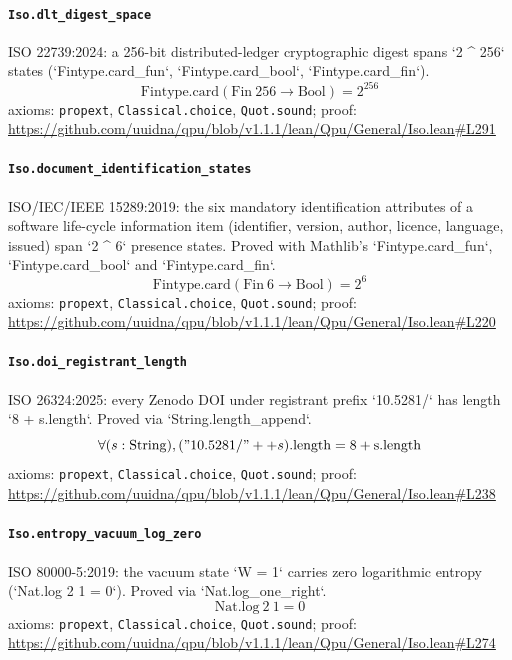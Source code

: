 \documentclass[11pt]{article}
\begin{document}
\paragraph{\texttt{Iso.dlt\_digest\_space}}
ISO 22739:2024: a 256-bit distributed-ledger cryptographic digest spans `2 \^{} 256` states (`Fintype.card\_fun`, `Fintype.card\_bool`, `Fintype.card\_fin`).
\[ \mathrm{Fintype.card} (\mathrm{Fin}\ 256 \to \mathrm{Bool}) = 2 ^{256} \]
\noindent axioms: \texttt{propext}, \texttt{Classical.choice}, \texttt{Quot.sound}; proof: \url{https://github.com/uuidna/qpu/blob/v1.1.1/lean/Qpu/General/Iso.lean\#L291}

\paragraph{\texttt{Iso.document\_identification\_states}}
ISO/IEC/IEEE 15289:2019: the six mandatory identification attributes of a software life-cycle information item (identifier, version, author, licence, language, issued) span `2 \^{} 6` presence states. Proved with Mathlib's `Fintype.card\_fun`, `Fintype.card\_bool` and `Fintype.card\_fin`.
\[ \mathrm{Fintype.card} (\mathrm{Fin}\ 6 \to \mathrm{Bool}) = 2 ^{6} \]
\noindent axioms: \texttt{propext}, \texttt{Classical.choice}, \texttt{Quot.sound}; proof: \url{https://github.com/uuidna/qpu/blob/v1.1.1/lean/Qpu/General/Iso.lean\#L220}

\paragraph{\texttt{Iso.doi\_registrant\_length}}
ISO 26324:2025: every Zenodo DOI under registrant prefix `10.5281/` has length `8 + s.length`. Proved via `String.length\_append`.
\[ \forall (s : \mathrm{String}), ("\mathrm{10.5281}/" ++ s)\mathrm{.length} = 8 + \mathrm{s.length} \]
\noindent axioms: \texttt{propext}, \texttt{Classical.choice}, \texttt{Quot.sound}; proof: \url{https://github.com/uuidna/qpu/blob/v1.1.1/lean/Qpu/General/Iso.lean\#L238}

\paragraph{\texttt{Iso.entropy\_vacuum\_log\_zero}}
ISO 80000-5:2019: the vacuum state `W = 1` carries zero logarithmic entropy (`Nat.log 2 1 = 0`). Proved via `Nat.log\_one\_right`.
\[ \mathrm{Nat.log}\ 2\ 1 = 0 \]
\noindent axioms: \texttt{propext}, \texttt{Classical.choice}, \texttt{Quot.sound}; proof: \url{https://github.com/uuidna/qpu/blob/v1.1.1/lean/Qpu/General/Iso.lean\#L274}
\end{document}

